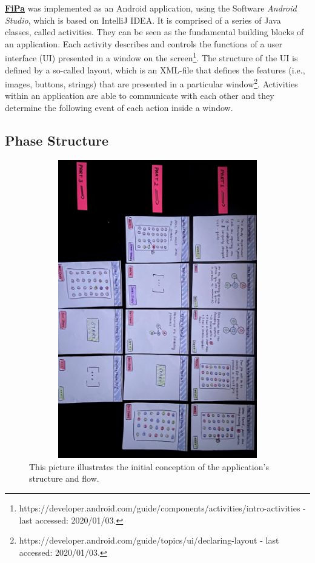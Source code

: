 \underline{\textbf{FiPa}} was implemented as an Android application, using the Software \textit{Android Studio}, which is based on IntelliJ IDEA. It is comprised of a series of Java classes, called activities. They can be seen as the fundamental building blocks of an application. Each activity describes and controls the functions of a user interface (UI) presented in a window on the screen\footnote{https://developer.android.com/guide/components/activities/intro-activities - last accessed: 2020/01/03.}. The structure of the UI is defined by a so-called layout, which is an XML-file that defines the features (i.e., images, buttons, strings) that are presented in a particular window\footnote{https://developer.android.com/guide/topics/ui/declaring-layout - last accessed: 2020/01/03.}. Activities within an application are able to communicate with each other and they determine the following event of each action inside a window. 

\subsection{Phase Structure} \label{4.3.1}

\begin{figure}[t!]
\centering
\includegraphics[width=15cm, height=13cm]{Chapters/graphics/pitch.jpg}
\caption{This picture illustrates the initial conception of the application's structure and flow.}
\label{fig:fipapitch}
\end{figure}

